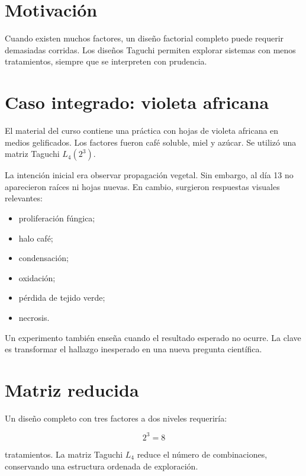 
\section{Motivación}

Cuando existen muchos factores, un diseño factorial completo puede requerir demasiadas corridas. Los diseños Taguchi permiten explorar sistemas con menos tratamientos, siempre que se interpreten con prudencia.

\section{Caso integrado: violeta africana}

El material del curso contiene una práctica con hojas de violeta africana en medios gelificados. Los factores fueron café soluble, miel y azúcar. Se utilizó una matriz Taguchi \(L_4(2^3)\).

La intención inicial era observar propagación vegetal. Sin embargo, al día 13 no aparecieron raíces ni hojas nuevas. En cambio, surgieron respuestas visuales relevantes:

\begin{itemize}
  \item proliferación fúngica;
  \item halo café;
  \item condensación;
  \item oxidación;
  \item pérdida de tejido verde;
  \item necrosis.
\end{itemize}

\begin{idea}
Un experimento también enseña cuando el resultado esperado no ocurre. La clave es transformar el hallazgo inesperado en una nueva pregunta científica.
\end{idea}

\section{Matriz reducida}

Un diseño completo con tres factores a dos niveles requeriría:

\[
2^3 = 8
\]

tratamientos. La matriz Taguchi \(L_4\) reduce el número de combinaciones, conservando una estructura ordenada de exploración.

